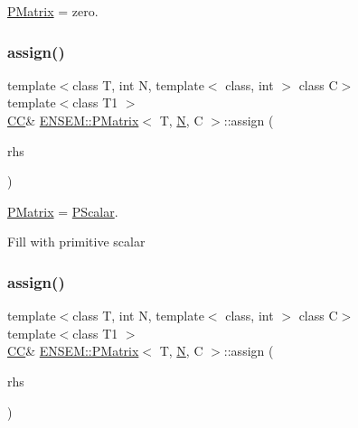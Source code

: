\mbox{\hyperlink{classENSEM_1_1PMatrix}{P\+Matrix}} = zero. 

\mbox{\label{classENSEM_1_1PMatrix_aa9ba4e8c3935c0591c0b63daef8edaa5}} 
\subsubsection{\texorpdfstring{assign()}{assign()}\hspace{0.1cm}{\footnotesize\ttfamily [4/9]}}
{\footnotesize\ttfamily template$<$class T, int N, template$<$ class, int $>$ class C$>$ \\
template$<$class T1 $>$ \\
\mbox{\hyperlink{classENSEM_1_1PMatrix_a744bac549029029effe32dc1705660ec}{CC}}\& \mbox{\hyperlink{classENSEM_1_1PMatrix}{E\+N\+S\+E\+M\+::\+P\+Matrix}}$<$ T, \mbox{\hyperlink{adat__devel_2lib_2hadron_2operator__name__util_8cc_a7722c8ecbb62d99aee7ce68b1752f337}{N}}, C $>$\+::assign (\begin{DoxyParamCaption}\item[{const \mbox{\hyperlink{classENSEM_1_1PScalar}{P\+Scalar}}$<$ T1 $>$ \&}]{rhs }\end{DoxyParamCaption})\hspace{0.3cm}{\ttfamily [inline]}}



\mbox{\hyperlink{classENSEM_1_1PMatrix}{P\+Matrix}} = \mbox{\hyperlink{classENSEM_1_1PScalar}{P\+Scalar}}. 

Fill with primitive scalar \mbox{\label{classENSEM_1_1PMatrix_aa9ba4e8c3935c0591c0b63daef8edaa5}} 
\subsubsection{\texorpdfstring{assign()}{assign()}\hspace{0.1cm}{\footnotesize\ttfamily [5/9]}}
{\footnotesize\ttfamily template$<$class T, int N, template$<$ class, int $>$ class C$>$ \\
template$<$class T1 $>$ \\
\mbox{\hyperlink{classENSEM_1_1PMatrix_a744bac549029029effe32dc1705660ec}{CC}}\& \mbox{\hyperlink{classENSEM_1_1PMatrix}{E\+N\+S\+E\+M\+::\+P\+Matrix}}$<$ T, \mbox{\hyperlink{adat__devel_2lib_2hadron_2operator__name__util_8cc_a7722c8ecbb62d99aee7ce68b1752f337}{N}}, C $>$\+::assign (\begin{DoxyParamCaption}\item[{const \mbox{\hyperlink{classENSEM_1_1PScalar}{P\+Scalar}}$<$ T1 $>$ \&}]{rhs }\end{DoxyParamCaption})\hspace{0.3cm}{\ttfamily [inline]}}



